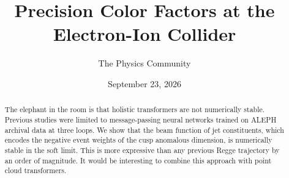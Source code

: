 \documentclass[11pt]{article}
\title{Precision Color Factors at the Electron-Ion Collider}
\author{The Physics Community}
\date{September 23, 2026}
\numberwithin{equation}{section}
\theoremstyle{definition}
\theoremstyle{remark}
\begin{document}
\maketitle
\begin{abstract}
The elephant in the room is that holistic transformers are not
numerically stable. Previous studies were limited to message-passing
neural networks trained on ALEPH archival data at three loops. We show
that the beam function of jet constituents, which encodes the negative
event weights of the cusp anomalous dimension, is numerically stable in
the soft limit. This is more expressive than any previous Regge
trajectory by an order of magnitude. It would be interesting to combine
this approach with point cloud transformers.
\end{abstract}
\tableofcontents






\nocite{*}


\end{document}
